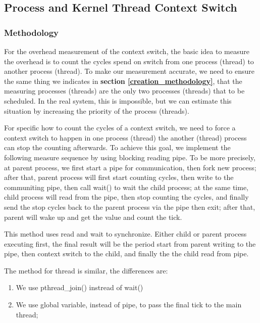 \subsection{Process and Kernel Thread Context Switch}

\subsubsection{Methodology}

For the overhead measurement of the context switch, the basic idea to measure the overhead is to count the cycles spend on switch from one process (thread) to another process (thread). To make our measurement accurate, we need to ensure the same thing we indicates in
\textbf{section \ref{creation_methodology}}, that the measuring processes (threads) are the only two processes (threads) that to be scheduled. In the real system, this is impossible, but we can estimate this situation by increasing the priority of the process (threads).

For specific how to count the cycles of a context switch, we need to force a context switch to happen in one process (thread) the another (thread) process can stop the counting afterwards. To achieve this goal, we implement the following measure sequence by using blocking
reading pipe. To be more precisely, at parent process, we first start a pipe for communication, then fork new process; after that, parent process will first start counting cycles, then write to the communiting pipe, then call wait() to wait the child process; at the same time, child process will read from the pipe, then stop counting the cycles, and finally send the stop cycles back to the parent process via the pipe then exit; after that, parent will wake up and get the value and count the tick.

This method uses read and wait to synchronize. Either child or parent process executing first, the final result will be the period start from parent writing to the pipe, then context switch to the child, and finally the the child read from pipe.

The method for thread is similar, the differences are:

\begin{enumerate}
    \item We use pthread\_join() instread of wait()
    \item We use global variable, instead of pipe, to pass the final tick to the main thread;
\end{enumerate}


